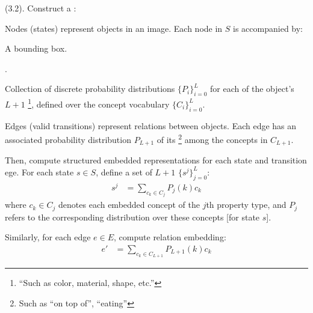 \documentclass[11pt]{article}
\begin{document}
 (3.2). Construct a :
\begin{compactitem}
	\item Nodes (states) represent objects in an image. Each node in $S$ is accompanied by:
	\begin{compactitem}
		\item A bounding box.
		\item {}. 
		\item Collection of discrete probability distributions $\{P_i\}_{i=0}^{L}$ for each of the object's $L+1$ \footnote{``Such as color, material, shape, etc.''}, defined over the concept vocabulary $\{C_i\}_{i=0}^{L}$. 
	\end{compactitem} 
	
	\item Edges (valid transitions) represent relations between objects. Each edge has an associated probability distribution $P_{L+1}$ of its \footnote{Such as ``on top of'', ``eating''} among the concepts in $C_{L+1}$. 
\end{compactitem}

Then, compute structured embedded representations for each state and transition ege. For each state $s \in S$, define a set of $L+1$  $\{s^j\}_{j=0}^{L}$:
\begin{align}
s^j &= \sum_{c_k \in C_j} P_j(k) c_k
\end{align}
where $c_k \in C_j$ denotes each embedded concept of the $j$th property type, and $P_j$ refers to the corresponding distribution over these concepts [for state $s$]. 


Similarly, for each edge $e \in E$, compute relation embedding:
\begin{align}
e' &= \sum_{c_k \in C_{L+1}} P_{L+1}(k) c_k
\end{align}
\end{document}
